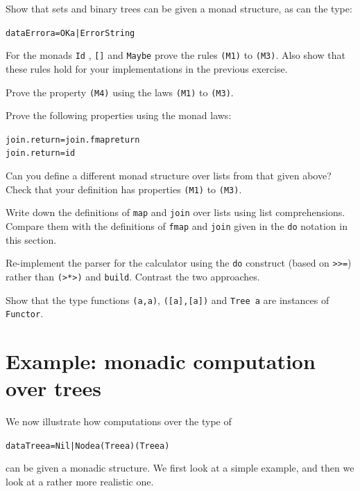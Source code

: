 \begin{exercises}

\item
Show that sets and binary trees
can be given a monad structure, as can the type:
\begin{alltt}
data Error a = OK a | Error String
\end{alltt}

\item
For the monads \texttt{Id} , \texttt{[]} and \texttt{Maybe} prove the rules 
\texttt{(M1)} to \texttt{(M3)}. Also show that
these rules hold for your implementations in the
previous exercise.

\item
Prove the property \texttt{(M4)} using the laws \texttt{(M1)} to \texttt{(M3)}.

\item 
Prove the following properties using the monad laws:
\begin{alltt}
join . return = join . fmap return
join . return = id
\end{alltt}

\item
Can you define a different monad structure over lists from that given above?
Check that your definition has properties \texttt{(M1)} to \texttt{(M3)}.

\item
Write down the definitions of \texttt{map} and \texttt{join} over lists
using list comprehensions. Compare them with the definitions of
\texttt{fmap} and \texttt{join} given in the \texttt{do} notation in this section.

\item
Re-implement the parser for the calculator using the \texttt{do}
construct (based on \texttt{>>=}) 
rather than \texttt{(>*>)} and \texttt{build}. Contrast the two
approaches.

\item
Show that the type functions \texttt{(a,a)}, \texttt{([a],[a])} and \texttt{Tree a} are instances of \texttt{Functor}.

\end{exercises}

\section{Example: monadic computation over trees}
\label{monadicTrees}

We now illustrate how computations over the type of 
\begin{alltt}
data Tree a = Nil | Node a (Tree a) (Tree a)
\end{alltt}
can be given a monadic structure. We first look at a simple example, and then
we look at a rather more realistic one. 

